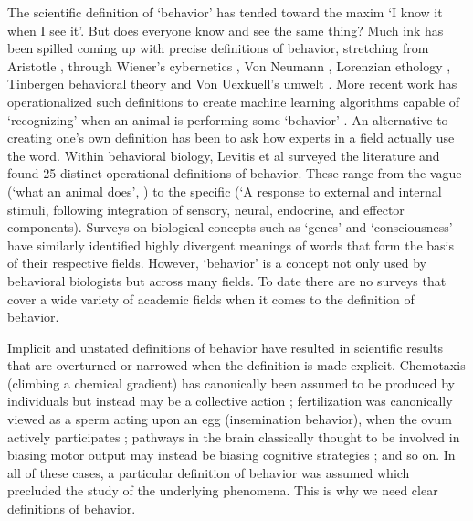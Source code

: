 \documentclass[a4paper, 11pt]{article}
\begin{document}
The scientific definition of `behavior' has tended toward the maxim `I know it when I see it'. But does everyone know and see the same thing? Much ink has been spilled coming up with precise definitions of behavior, stretching from Aristotle \cite{aristotle}, through Wiener's cybernetics \cite{wiener2019cybernetics}, Von Neumann \cite{von2012computer}, Lorenzian ethology \cite{lorenz2013foundations}, Tinbergen behavioral theory \cite{tinbergen1972animal} and Von Uexkuell's umwelt \cite{uexkull1921umwelt}. More recent work has operationalized such definitions to create machine learning algorithms capable of `recognizing' when an animal is performing some `behavior' \cite{berman2014mapping,wiltschko2015mapping,calhoun2019unsupervised}. An alternative to creating one's own definition has been to ask how experts in a field actually use the word. Within behavioral biology, Levitis et al \cite{levitis2009behavioural} surveyed the literature and found 25 distinct operational definitions of behavior. These range from the vague (`what an animal does', \cite{davis1966integral}) to the specific (`A response to external and internal stimuli, following integration of sensory, neural, endocrine, and effector components). Surveys on biological concepts such as `genes' and `consciousness' \cite{consciousness-2021,stotz2004biologists} have similarly identified highly divergent meanings of words that form the basis of their respective fields. However, `behavior' is a concept not only used by behavioral biologists but across many fields. To date there are no surveys that cover a wide variety of academic fields when it comes to the definition of behavior.

Implicit and unstated definitions of behavior have resulted in scientific results that are overturned or narrowed when the definition is made explicit. Chemotaxis (climbing a chemical gradient) has canonically been assumed to be produced by individuals but instead may be a collective action \cite{ramdya2014group}; fertilization was canonically viewed as a sperm acting upon an egg (insemination behavior), when the ovum actively participates \cite{kekalainen2018gamete}; pathways in the brain classically thought to be involved in biasing motor output may instead be biasing cognitive strategies \cite{bolkan2021strong}; and so on. In all of these cases, a particular definition of behavior was assumed which precluded the study of the underlying phenomena. This is why we need clear definitions of behavior.
\end{document}
